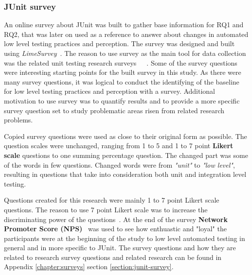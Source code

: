     \subsubsection{JUnit survey}
    An online survey about JUnit was built to gather base information for RQ1 and RQ2, that was
    later on used as a reference to answer about changes in automated low level testing practices and perception.
    The survey was designed and built using \textit{LimeSurvey}~\cite{limesurvey}. The reason to use survey as the main tool for data collection
    was the related unit testing research surveys~\cite{williams2009effectiveness}~\cite{daka2014survey}~\cite{li2016automatically}.
    Some of the survey questions were interesting starting points
    for the built survey in this study. As there were many survey questions, it was logical to conduct the identifying
    of the baseline for low level testing practices and perception with a survey. Additional motivation to use
    survey was to quantify results and to provide a more specific survey question set to study problematic
    areas risen from related research problems.

    Copied survey questions were used as close to their original form as possible.
    The question scales were unchanged, ranging from 1 to 5 and 1 to 7 point \textbf{Likert scale} questions
    to one summing percentage question. The changed part was some of the words in few questions.
    Changed words were from \textit{"unit"} to \textit{"low level"},
    resulting in questions that take into consideration both unit and integration level testing.

    Questions created for this research were mainly 1 to 7 point Likert scale questions.
    The reason to use 7 point Likert scale was to increase the discriminating power of the questions~\cite{cummins2000we}.
    At the end of the survey \textbf{Network Promoter Score (NPS)}~\cite{reichheld2003one} was used to see how enthuastic and "loyal" the participants
    were at the beginning of the study to low level automated testing in general and in more specific to JUnit.
    The survey questions and how they are related to research survey questions and related research can be found
    in Appendix \ref{chapter:surveys} section \ref{section:junit-survey}.

